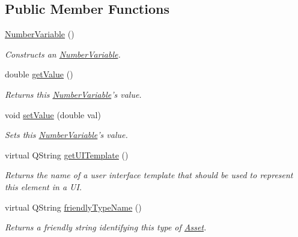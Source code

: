 \subsection*{Public Member Functions}
\begin{DoxyCompactItemize}
\item 
\hyperlink{class_picto_1_1_number_variable_a2e3e98c345b9c2bbee184c2606485b66}{Number\-Variable} ()
\begin{DoxyCompactList}\small\item\em Constructs an \hyperlink{class_picto_1_1_number_variable}{Number\-Variable}. \end{DoxyCompactList}\item 
\hypertarget{class_picto_1_1_number_variable_a5503fd3caef3854081c028e709813d13}{double \hyperlink{class_picto_1_1_number_variable_a5503fd3caef3854081c028e709813d13}{get\-Value} ()}\label{class_picto_1_1_number_variable_a5503fd3caef3854081c028e709813d13}

\begin{DoxyCompactList}\small\item\em Returns this \hyperlink{class_picto_1_1_number_variable}{Number\-Variable}'s value. \end{DoxyCompactList}\item 
\hypertarget{class_picto_1_1_number_variable_ada17ed95cb402cb460dcb75a90023045}{void \hyperlink{class_picto_1_1_number_variable_ada17ed95cb402cb460dcb75a90023045}{set\-Value} (double val)}\label{class_picto_1_1_number_variable_ada17ed95cb402cb460dcb75a90023045}

\begin{DoxyCompactList}\small\item\em Sets this \hyperlink{class_picto_1_1_number_variable}{Number\-Variable}'s value. \end{DoxyCompactList}\item 
\hypertarget{class_picto_1_1_number_variable_a0c267c6c0235d82ff41495edaa369889}{virtual Q\-String \hyperlink{class_picto_1_1_number_variable_a0c267c6c0235d82ff41495edaa369889}{get\-U\-I\-Template} ()}\label{class_picto_1_1_number_variable_a0c267c6c0235d82ff41495edaa369889}

\begin{DoxyCompactList}\small\item\em Returns the name of a user interface template that should be used to represent this element in a U\-I. \end{DoxyCompactList}\item 
virtual Q\-String \hyperlink{class_picto_1_1_number_variable_a5184a95861f786c2068e85b9eb190724}{friendly\-Type\-Name} ()
\begin{DoxyCompactList}\small\item\em Returns a friendly string identifying this type of \hyperlink{class_picto_1_1_asset}{Asset}. \end{DoxyCompactList}\end{DoxyCompactItemize}
